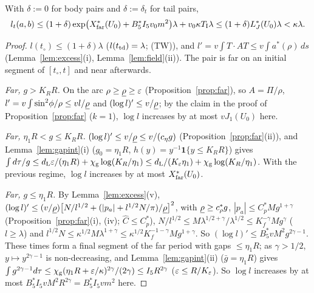 \begin{proposition}[Length]\label{prop:length}
With $\delta:=0$ for body pairs and $\delta:=\delta_t$ for tail pairs,
\[
l_t(a,b)\le(1+\delta)\exp\bigl(X^*_{\mathrm{far}}(U_0)+B_5^*I_5v_0 m^2\bigr)\lambda+v_0\kappa T_{\mathrm I}\lambda\le(1+\delta)L^*_J(U_0)\lambda<\kappa\lambda .
\]
\end{proposition}

\begin{proof}
$l(t_\circ)\le(1+\delta)\lambda$ ($l(t_{\mathrm{td}})=\lambda$; (TW)), and $l'=v\int T\cdot AT\le v\int a^*(\rho)\,ds$ (Lemma~\ref{lem:excess}(i),
Lemma~\ref{lem:field}(ii)). The pair is far on an initial segment of $[t_\circ,t]$ and near afterwards.

\emph{Far, $g>K_RR$.} On the arc $\rho\ge\underline\rho\ge\varepsilon$ (Proposition~\ref{prop:far}), so $A=\Pi/\rho$, $l'=v\int\sin^2\!\phi/\rho\le vl/\underline\rho$
and $(\log l)'\le v/\underline\rho$; by the claim in the proof of Proposition~\ref{prop:far} ($k=1$), $\log l$ increases by at most $vJ_1(U_0)$
here.

\emph{Far, $\eta_1R<g\le K_RR$.} $(\log l)'\le v/\underline\rho\le v/(c_\eta g)$ (Proposition~\ref{prop:far}(ii)), and Lemma~\ref{lem:gapint}(i)
($g_0=\eta_1R$, $h(y)=y^{-1}\mathbf 1\{y\le K_RR\}$) gives $\int d\tau/g\le d_{\mathrm L}\varepsilon/(\eta_1R)+\chi_{\mathrm g}\log(K_R/\eta_1)\le d_{\mathrm L}/(K_\varepsilon\eta_1)+\chi_{\mathrm g}\log(K_R/\eta_1)$.
With the previous regime, $\log l$ increases by at most $X^*_{\mathrm{far}}(U_0)$.

\emph{Far, $g\le\eta_1R$.} By Lemma~\ref{lem:excess}(v), $(\log l)'\le(v/\underline\rho)\bigl[N/l^{1/2}+(|p_a|+l^{1/2}N/\pi)/\underline\rho\bigr]^2$, with
$\underline\rho\ge c_\rho^*g$, $|p_a|\le C_p^*Mg^{1+\gamma}$ (Proposition~\ref{prop:far}(i), (iv); $\hat C\le C_p^*$),
$N/l^{1/2}\le M\lambda^{1/2+\gamma}/\lambda^{1/2}\le K_f^{-\gamma}Mg^\gamma$ ($l\ge\lambda$) and
$l^{1/2}N\le\kappa^{1/2}M\lambda^{1+\gamma}\le\kappa^{1/2}K_f^{-1-\gamma}Mg^{1+\gamma}$. So $(\log l)'\le B_5^*vM^2g^{2\gamma-1}$. These times form
a final segment of the far period with gaps $\le\eta_1R$; as $\gamma>1/2$, $y\mapsto y^{2\gamma-1}$ is non-decreasing, and
Lemma~\ref{lem:gapint}(ii) ($\bar g=\eta_1R$) gives $\int g^{2\gamma-1}d\tau\le\chi_{\mathrm g}(\eta_1R+\varepsilon/\kappa)^{2\gamma}/(2\gamma)\le I_5R^{2\gamma}$
($\varepsilon\le R/K_\varepsilon$). So $\log l$ increases by at most $B_5^*I_5vM^2R^{2\gamma}=B_5^*I_5vm^2$ here.


\end{proof}
